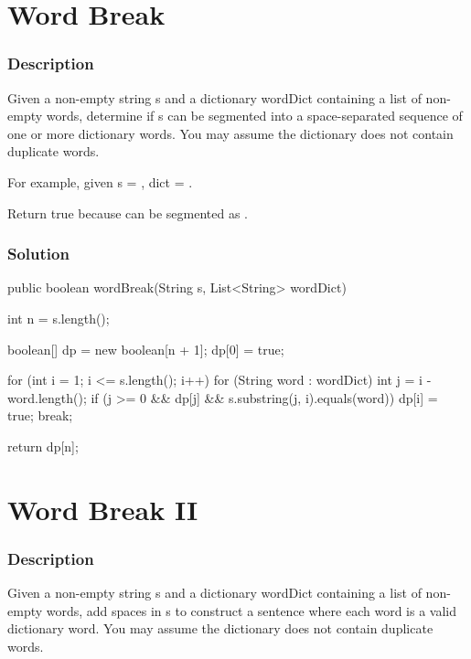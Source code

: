 \newpage

\section{Word Break} %

\subsubsection{Description}
Given a non-empty string s and a dictionary wordDict containing a list of non-empty words, determine if s can be segmented into a space-separated sequence of one or more dictionary words. You may assume the dictionary does not contain duplicate words.

For example, given
s = ,
dict = .

Return true because  can be segmented as .

\subsubsection{Solution}

\begin{Code}
public boolean wordBreak(String s, List<String> wordDict) {
    int n = s.length();

    boolean[] dp = new boolean[n + 1];
    dp[0] = true;

    for (int i = 1; i <= s.length(); i++) {
        for (String word : wordDict) {
            int j = i - word.length();
            if (j >= 0 && dp[j] && s.substring(j, i).equals(word)) {
                dp[i] = true;
                break;
            }
        }
    }

    return dp[n];
}
\end{Code}

\newpage

\section{Word Break II} %

\subsubsection{Description}
Given a non-empty string s and a dictionary wordDict containing a list of non-empty words, add spaces in s to construct a sentence where each word is a valid dictionary word. You may assume the dictionary does not contain duplicate words.

